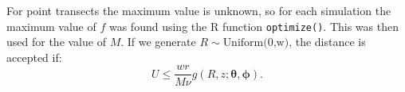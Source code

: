 \documentclass[useAMS,referee, usegraphicx]{biom}
\begin{document}
For point transects the maximum value is unknown, so for each simulation the maximum value of $f$ was found using the \textsf{R} function \texttt{optimize()}. This was then used for the value of $M$. If we generate $R \sim \text{Uniform(0,w)}$, the distance is accepted if:
\begin{equation*}
U \leq \frac{wr}{M\nu}g(R,z; \bm{\theta}, \bm{\phi}).
\end{equation*}

\label{lastpage}
\end{document}
